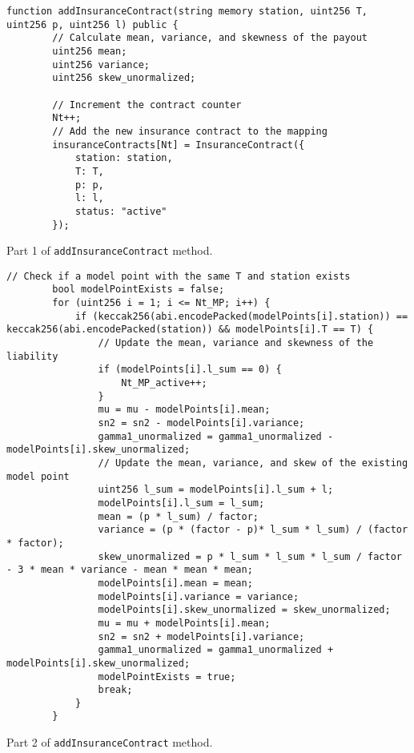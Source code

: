 \documentclass[10pt]{article}
\begin{document}
\begin{codefragment}[!h]
\begin{lstlisting}[language=Solidity]
    function addInsuranceContract(string memory station, uint256 T, uint256 p, uint256 l) public {
        // Calculate mean, variance, and skewness of the payout
        uint256 mean;
        uint256 variance;
        uint256 skew_unormalized;

        // Increment the contract counter
        Nt++;
        // Add the new insurance contract to the mapping
        insuranceContracts[Nt] = InsuranceContract({
            station: station,
            T: T,
            p: p,
            l: l,
            status: "active"
        });
                \end{lstlisting}
    \caption{Part 1 of \texttt{addInsuranceContract} method.}
    \label{code:addInsuranceContract_1}
\end{codefragment}
\begin{codefragment}[!h]
\begin{lstlisting}[language=Solidity]
        // Check if a model point with the same T and station exists
        bool modelPointExists = false;
        for (uint256 i = 1; i <= Nt_MP; i++) {
            if (keccak256(abi.encodePacked(modelPoints[i].station)) == keccak256(abi.encodePacked(station)) && modelPoints[i].T == T) {
                // Update the mean, variance and skewness of the liability
                if (modelPoints[i].l_sum == 0) {
                    Nt_MP_active++;
                }
                mu = mu - modelPoints[i].mean;
                sn2 = sn2 - modelPoints[i].variance;
                gamma1_unormalized = gamma1_unormalized - modelPoints[i].skew_unormalized;
                // Update the mean, variance, and skew of the existing model point
                uint256 l_sum = modelPoints[i].l_sum + l;
                modelPoints[i].l_sum = l_sum;
                mean = (p * l_sum) / factor;
                variance = (p * (factor - p)* l_sum * l_sum) / (factor * factor);
                skew_unormalized = p * l_sum * l_sum * l_sum / factor - 3 * mean * variance - mean * mean * mean;
                modelPoints[i].mean = mean;
                modelPoints[i].variance = variance;
                modelPoints[i].skew_unormalized = skew_unormalized;
                mu = mu + modelPoints[i].mean;
                sn2 = sn2 + modelPoints[i].variance;
                gamma1_unormalized = gamma1_unormalized + modelPoints[i].skew_unormalized;
                modelPointExists = true;
                break;
            }
        }
        \end{lstlisting}
    \caption{Part 2 of \texttt{addInsuranceContract} method.}
    \label{code:addInsuranceContract_2}
\end{codefragment}
\end{document}
